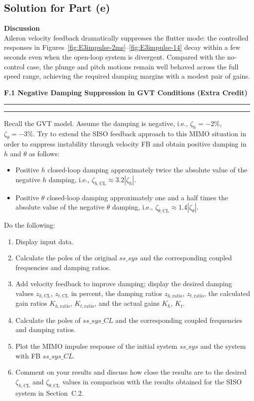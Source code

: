 \documentclass[12pt]{article}
\newcommand{\question}[1]{%
  \clearpage
  \vspace{0.5cm}
  {\noindent\normalsize \textbf{#1}}%
  \vspace{0.2cm}
  \hrule
  \vspace{0.1cm}
  \hrule
  \vspace{0.3cm}
}
\begin{document}
\subsection*{Solution for Part (e)}

\begin{resultsbox}
\textbf{Discussion}\\[0.5em]
Aileron velocity feedback dramatically suppresses the flutter mode: the controlled responses in Figures~\ref{fig:E3impulse-2ms}--\ref{fig:E3impulse-14} decay within a few seconds even when the open-loop system is divergent.  Compared with the no-control case, the plunge and pitch motions remain well behaved across the full speed range, achieving the required damping margins with a modest pair of gains.
\end{resultsbox}

\question{F.1 Negative Damping Suppression in GVT Conditions (Extra Credit)}\label{quest:F1}

Recall the GVT model. Assume the damping is negative, i.e., $\zeta_h = -2\%$, $\zeta_\theta = -3\%$. Try to extend the SISO feedback approach to this MIMO situation in order to suppress instability through velocity FB and obtain positive damping in $h$ and $\theta$ as follows:
\begin{itemize}
  \item Positive $h$ closed-loop damping approximately twice the absolute value of the negative $h$ damping, i.e., $\zeta_{h,\text{CL}} \approx 3.2|\zeta_h|$.
  \item Positive $\theta$ closed-loop damping approximately one and a half times the absolute value of the negative $\theta$ damping, i.e., $\zeta_{\theta,\text{CL}} \approx 1.4|\zeta_\theta|$.
\end{itemize}
Do the following:
\begin{enumerate}[label=(\alph*)]
  \item Display input data.
  \item Calculate the poles of the original $ss\_sys$ and the corresponding coupled frequencies and damping ratios.
  \item Add velocity feedback to improve damping; display the desired damping values $z_{h,\text{CL}}$, $z_{t,\text{CL}}$ in percent, the damping ratios $z_{h,\text{ratio}}$, $z_{t,\text{ratio}}$, the calculated gain ratios $K_{h,\text{ratio}}$, $K_{t,\text{ratio}}$, and the actual gains $K_h$, $K_t$.
  \item Calculate the poles of $ss\_sys\_CL$ and the corresponding coupled frequencies and damping ratios.
  \item Plot the MIMO impulse response of the initial system $ss\_sys$ and the system with FB $ss\_sys\_CL$.
  \item Comment on your results and discuss how close the results are to the desired $\zeta_{h,\text{CL}}$ and $\zeta_{\theta,\text{CL}}$ values in comparison with the results obtained for the SISO system in Section~C.2.
\end{enumerate}
\end{document}
